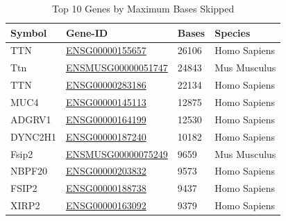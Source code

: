 \documentclass{article}
\begin{document}
    \begin{table}[H]
        \caption{Top 10 Genes by Maximum Bases Skipped}
        \label{tab:bases-skipped}
        \begin{center}
            \begin{tabular}{ |p{2cm}|p{4cm}|p{2cm}| p{2.5cm}|  }
                \hline
                Symbol  & Gene-ID                                                                                           & Bases & Species      \\
                \hline
                TTN     & \href{https://www.ensembl.org/Homo_sapiens/Gene/Summary?g=ENSG00000155657}{ENSG00000155657} & 26106 & Homo Sapiens \\
                Ttn     & \href{https://www.ensembl.org/mus_musculus/Gene/Summary?g=ENSMUSG00000051747}{ENSMUSG00000051747}   & 24843 & Mus Musculus \\
                TTN     & \href{https://www.ensembl.org/Homo_sapiens/Gene/Idhistory?g=ENSG00000283186}{ENSG00000283186} & 22134 & Homo Sapiens \\
                MUC4    & \href{https://www.ensembl.org/Homo_sapiens/Gene/Summary?g=ENSG00000145113}{ENSG00000145113} & 12875 & Homo Sapiens \\
                ADGRV1  & \href{https://www.ensembl.org/Homo_sapiens/Gene/Summary?g=ENSG00000164199}{ENSG00000164199} & 12530 & Homo Sapiens \\
                DYNC2H1 & \href{https://www.ensembl.org/Homo_sapiens/Gene/Summary?g=ENSG00000187240}{ENSG00000187240} & 10182 & Homo Sapiens   \\
                Fsip2   & \href{https://www.ensembl.org/mus_musculus/Gene/Summary?g=ENSMUSG00000075249}{ENSMUSG00000075249} & 9659 & Mus Musculus \\
                NBPF20  & \href{https://www.ensembl.org/Homo_sapiens/Gene/Idhistory?g=ENSG00000203832}{ENSG00000203832} & 9573 & Homo Sapiens \\
                FSIP2   & \href{https://www.ensembl.org/Homo_sapiens/Gene/Summary?g=ENSG00000188738}{ENSG00000188738} & 9437 & Homo Sapiens \\
                XIRP2   & \href{https://www.ensembl.org/Homo_sapiens/Gene/Summary?g=ENSG00000163092}{ENSG00000163092} & 9379 & Homo Sapiens \\
                \hline
            \end{tabular}
        \end{center}
    \end{table}
\end{document}
